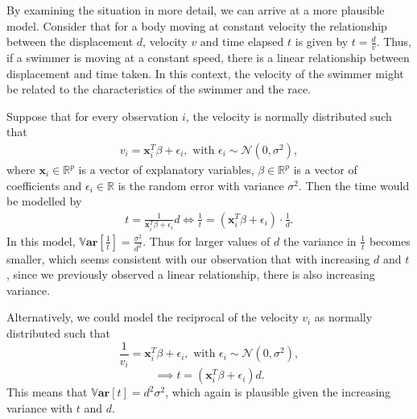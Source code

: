 \documentclass[a4paper,11pt]{article}
\begin{document}
By examining the situation in more detail, we can arrive at a more plausible model. Consider that for a body moving at constant velocity the relationship between the displacement $d$, velocity $v$ and time elapsed $t$ is given by $t = \frac{d}{v}$. Thus, if a swimmer is moving at a constant speed, there is a linear relationship between displacement and time taken. In this context, the velocity of the swimmer might be related to the characteristics of the swimmer and the race.

Suppose that for every observation $i$, the velocity is normally distributed such that
\begin{align}
  v_i = \mathbf{x}_i^T \beta + \epsilon_i, \text{ with } \epsilon_i \sim \mathcal{N}(0,\sigma^2),
\end{align}
where $\mathbf{x}_i \in \mathbb{R}^p$ is a vector of explanatory variables, $\beta \in \mathbb{R}^p$ is a vector of coefficients and $\epsilon_i \in \mathbb{R}$ is the random error with variance $\sigma^2$. Then the time would be modelled by
\begin{align}
  t = \frac{1}{\mathbf{x}_i^T \beta + \epsilon_i} d \Longleftrightarrow \frac{1}{t} =  (\mathbf{x}_i^T \beta + \epsilon_i) \cdot \frac{1}{d} . \label{weighted_model1}
\end{align}
In this model, $\mathbb{V} \mathbf{ar}[\frac{1}{t}] = \frac{\sigma^2}{d^2}$. Thus for larger values of $d$ the variance in $\frac{1}{t}$ becomes smaller, which seems consistent with our observation that with increasing $d$ and $t$, since we previously observed a linear relationship, there is also increasing variance.

Alternatively, we could model the reciprocal of the velocity $v_i$ as normally distributed such that
\begin{equation}
  \frac{1}{v_i} = \mathbf{x}_i^T \beta + \epsilon_i, \text{ with } \epsilon_i \sim \mathcal{N}(0,\sigma^2),
\end{equation}
\begin{equation}
   \implies t = (\mathbf{x}_i^T \beta + \epsilon_i) d . \label{weighted_model2}
\end{equation}
This means that $\mathbb{V} \mathbf{ar}[t] = d^2 \sigma^2$, which again is plausible given the increasing variance with $t$ and $d$.
\end{document}
